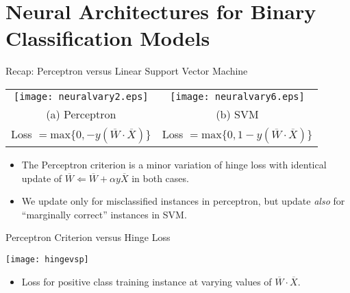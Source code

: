 
\section{Neural Architectures for Binary Classification Models}



\begin{frame}{Recap: Perceptron versus Linear Support Vector Machine}
 \begin{tabular}{cc}
\texttt{[image: neuralvary2.eps]}&
\texttt{[image: neuralvary6.eps]}\\
(a) Perceptron & (b) SVM  \\
 Loss $= \mbox{max}\{ 0, -y (\overline{W} \cdot \overline{X}) \}$
&    Loss $= \mbox{max}\{ 0, 1-y (\overline{W} \cdot \overline{X})
\}$
\end{tabular}
\begin{itemize}
\item The Perceptron criterion is a minor variation of hinge loss with identical update of $\overline{W}  \Leftarrow  \overline{W} +  \alpha  y
\overline{X}$ in both cases.
\item We update only for misclassified instances in perceptron, but update {\em also} for
``marginally correct'' instances in SVM.
\end{itemize}
\end{frame}


\begin{frame}{Perceptron Criterion versus Hinge Loss}
\begin{center}
\texttt{[image: hingevsp]}
\end{center}
\begin{itemize}
\item Loss for positive class training instance at varying values of
$\overline{W}\cdot \overline{X}$.
\end{itemize}
\end{frame}


